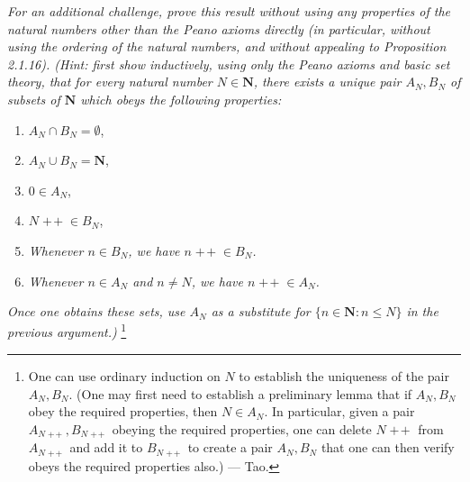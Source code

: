 \documentclass{book}
\DeclareMathOperator{\tadd}{+\!+}%
\begin{document}
\emph{For an additional challenge, prove this result without using any properties of the natural numbers other than the Peano axioms directly (in particular, without using the ordering of the natural numbers, and without appealing to Proposition 2.1.16). (Hint: first show inductively, using only the Peano axioms and basic set theory, that for every natural number $N\in\mathbf{N}$, there exists a unique pair $A_N,B_N$ of subsets of $\mathbf{N}$ which obeys the following properties:} %
\begin{enumerate}[itemindent=1em]
    \item $A_N\cap B_N=\emptyset$,
    \item $A_N\cup B_N=\mathbf{N}$,
    \item $0\in A_N$,
    \item $N\tadd\in B_N$,
    \item \emph{Whenever $n\in B_N$, we have $n\tadd\in B_N$.}
    \item \emph{Whenever $n\in A_N$ and $n\neq N$, we have $n\tadd\in A_N$.}
\end{enumerate}
\emph{Once one obtains these sets, use $A_N$ as a substitute for $\{n\in\mathbf{N}:n\leq N\}$ in the previous argument.)}
\footnote{One can use ordinary induction on $N$ to establish the uniqueness of the pair $A_N,B_N$. (One may first need to establish a preliminary lemma that if $A_N,B_N$ obey the required properties, then $N \in A_N$. In particular, given a pair $A_{N\tadd}, B_{N\tadd}$ obeying the required properties, one can delete $N\tadd$ from $A_{N\tadd}$ and add it to $B_{N\tadd}$ to create a pair $A_N,B_N$ that one can then verify obeys the required properties also.) --- Tao.}

\begin{comment}
\footnote{We rewrite the Peano axioms here:

\textbf{Axiom 1.} $0\in\mathbf{N}$.

\textbf{Axiom 2.} If $n\in\mathbf{N}$ then $n\tadd\in\mathbf{N}$.

\textbf{Axiom 3.} $n\tadd\neq 0$ for all $n\in\mathbf{N}$.

\textbf{Axiom 4.} If $n,m\in\mathbf{N}$ and $n\neq m$, then $n\tadd\neq m\tadd$. Equivalently, if $n\tadd=m\tadd$, then $n=m$.

\textbf{Axiom 5.} Principle of mathematical induction.}
\end{comment}
\end{document}
